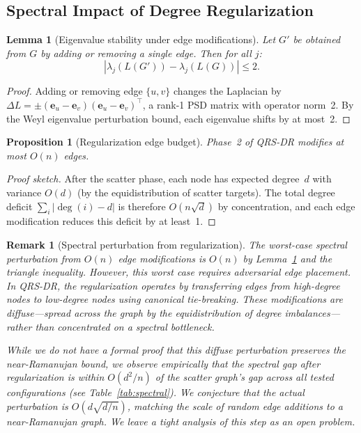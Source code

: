 \documentclass{article}
\newtheorem{lemma}[theorem]{Lemma}
\newtheorem{proposition}[theorem]{Proposition}
\newtheorem{remark}[theorem]{Remark}
\begin{document}
\subsection{Spectral Impact of Degree Regularization}

\begin{lemma}[Eigenvalue stability under edge modifications]
\label{lem:interlacing}
Let $G'$ be obtained from $G$ by adding or removing a single edge.
Then for all $j$:
\[
|\lambda_j(L(G')) - \lambda_j(L(G))| \le 2.
\]
\end{lemma}
\begin{proof}
Adding or removing edge $\{u,v\}$ changes the Laplacian by
$\Delta L = \pm(\mathbf{e}_u - \mathbf{e}_v)(\mathbf{e}_u - \mathbf{e}_v)^\top$,
a rank-1 PSD matrix with operator norm~2.  By the Weyl eigenvalue
perturbation bound, each eigenvalue shifts by at most~2.
\end{proof}

\begin{proposition}[Regularization edge budget]
\label{prop:edge_budget}
Phase~2 of QRS-DR modifies at most $O(n)$ edges.
\end{proposition}
\begin{proof}[Proof sketch]
After the scatter phase, each node has expected degree~$d$ with
variance $O(d)$ (by the equidistribution of scatter targets).
The total degree deficit $\sum_i |\deg(i) - d|$ is therefore
$O(n\sqrt{d})$ by concentration, and each edge modification
reduces this deficit by at least~1.
\end{proof}

\begin{remark}[Spectral perturbation from regularization]
\label{rem:spectral_perturbation}
The worst-case spectral perturbation from $O(n)$ edge modifications
is $O(n)$ by Lemma~\ref{lem:interlacing} and the triangle inequality.
However, this worst case requires adversarial edge placement.  In
QRS-DR, the regularization operates by transferring edges from
high-degree nodes to low-degree nodes using canonical tie-breaking.
These modifications are \emph{diffuse}---spread across the graph
by the equidistribution of degree imbalances---rather than
concentrated on a spectral bottleneck.

While we do not have a formal proof that this diffuse perturbation
preserves the near-Ramanujan bound, we observe empirically that the
spectral gap after regularization is within $O(d^2/n)$ of the scatter
graph's gap across all tested configurations (see
Table~\ref{tab:spectral}).  We conjecture that the actual perturbation
is $O(d\sqrt{d/n})$, matching the scale of random edge additions to
a near-Ramanujan graph.  We leave a tight analysis of this step as an
open problem.
\end{remark}
\end{document}
